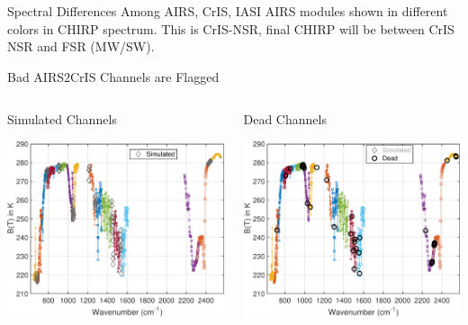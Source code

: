 \documentclass[10pt,t]{beamer}
\begin{document}
\begin{frame}[label={sec:org1c4e432}]{Spectral Differences Among AIRS, CrIS, IASI}
AIRS modules shown in different colors in CHIRP spectrum. This is CrIS-NSR, final CHIRP will be between CrIS NSR and FSR (MW/SW).
\end{frame}

\begin{frame}[label={sec:org2c660e7}]{Bad AIRS2CrIS Channels are Flagged}
\vspace{-0.35in}
\begin{columns}
\begin{column}{0.55\columnwidth}
\begin{block}{\footnotesize Simulated Channels}
\vspace{-0.05in}
\vspace{-0.05in}
\begin{center}
\includegraphics[width=0.77\linewidth]{./Figs/Pdf/a2c_full_show_sim.pdf}
\end{center}
\end{block}
\end{column}

\begin{column}{0.55\columnwidth}
\begin{block}{\footnotesize Dead Channels}
\vspace{-0.05in}
\vspace{-0.05in}
\begin{center}
\includegraphics[width=0.77\linewidth]{./Figs/Pdf/a2c_full_show_dead.pdf}
\end{center}
\end{block}
\end{column}
\end{columns}


\end{frame}
\end{document}

